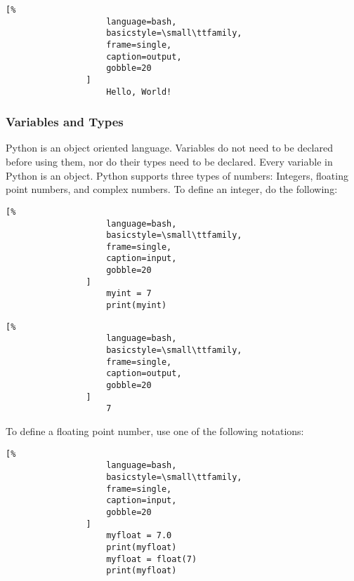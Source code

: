 \documentclass[crop=false,class=article,oneside]{standalone}
\begin{document}
            \hfill
            \begin{minipage}[t]{.48\textwidth}
                \centering
                \begin{lstlisting}[%
                    language=bash,
                    basicstyle=\small\ttfamily,
                    frame=single,
                    caption=output,
                    gobble=20
                ]
                    Hello, World!
            \end{lstlisting}
            \end{minipage}
        \subsubsection{Variables and Types}
            Python is an object oriented language.
            Variables do not need to be declared before using them,
            nor do their types need to be declared.
            Every variable in Python is an object.
            Python supports three types of numbers: Integers,
            floating point numbers, and complex numbers.
            To define an integer, do the following:\newline
            \begin{minipage}[t]{.48\textwidth}
                \centering
                \begin{lstlisting}[%
                    language=bash,
                    basicstyle=\small\ttfamily,
                    frame=single,
                    caption=input,
                    gobble=20
                ]
                    myint = 7
                    print(myint)
                \end{lstlisting}
            \end{minipage}
            \hfill
            \begin{minipage}[t]{.48\textwidth}
                \centering
                \begin{lstlisting}[%
                    language=bash,
                    basicstyle=\small\ttfamily,
                    frame=single,
                    caption=output,
                    gobble=20
                ]
                    7
                \end{lstlisting}
            \end{minipage}\newline
            To define a floating point number, use one of the
            following notations:
            \newline
            \begin{minipage}[t]{.48\textwidth}
                \centering
                \begin{lstlisting}[%
                    language=bash,
                    basicstyle=\small\ttfamily,
                    frame=single,
                    caption=input,
                    gobble=20
                ]
                    myfloat = 7.0
                    print(myfloat)
                    myfloat = float(7)
                    print(myfloat)
                \end{lstlisting}
            \end{minipage}
\end{document}
